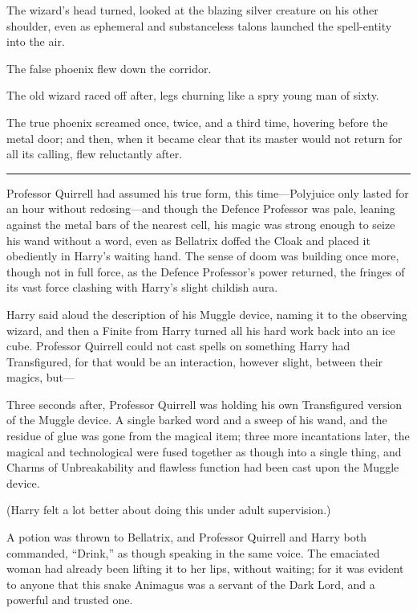 The wizard's head turned, looked at the blazing silver creature on his
other shoulder, even as ephemeral and substanceless talons launched the
spell-entity into the air.

The false phoenix flew down the corridor.

The old wizard raced off after, legs churning like a spry young man of
sixty.

The true phoenix screamed once, twice, and a third time, hovering before
the metal door; and then, when it became clear that its master would not
return for all its calling, flew reluctantly after.

\begin{center}\rule{3in}{0.4pt}\end{center}

Professor Quirrell had assumed his true form, this time---Polyjuice only
lasted for an hour without redosing---and though the Defence Professor
was pale, leaning against the metal bars of the nearest cell, his magic
was strong enough to seize his wand without a word, even as Bellatrix
doffed the Cloak and placed it obediently in Harry's waiting hand. The
sense of doom was building once more, though not in full force, as the
Defence Professor's power returned, the fringes of its vast force
clashing with Harry's slight childish aura.

Harry said aloud the description of his Muggle device, naming it to the
observing wizard, and then a Finite from Harry turned all his hard work
back into an ice cube. Professor Quirrell could not cast spells on
something Harry had Transfigured, for that would be an interaction,
however slight, between their magics, but---

Three seconds after, Professor Quirrell was holding his own Transfigured
version of the Muggle device. A single barked word and a sweep of his
wand, and the residue of glue was gone from the magical item; three more
incantations later, the magical and technological were fused together as
though into a single thing, and Charms of Unbreakability and flawless
function had been cast upon the Muggle device.

(Harry felt a lot better about doing this under adult supervision.)

A potion was thrown to Bellatrix, and Professor Quirrell and Harry both
commanded, ``Drink,'' as though speaking in the same voice. The
emaciated woman had already been lifting it to her lips, without
waiting; for it was evident to anyone that this snake Animagus was a
servant of the Dark Lord, and a powerful and trusted one.

